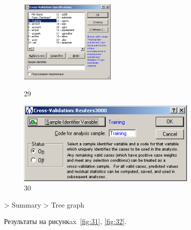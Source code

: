 \begin{figure}[!h]
  \centering

  \begin{minipage}{0.49\textwidth}
    \centering

    \includegraphics[height=4cm]
    {inc/29.PNG}

    \caption{29}

    \label{fig:29}
  \end{minipage}
  \begin{minipage}{0.49\textwidth}
    \centering

    \includegraphics[height=4cm]
    {inc/30.PNG}

    \caption{30}

    \label{fig:30}
  \end{minipage}
\end{figure}

\newpage

> Summary > Tree graph

Результаты на рисункax~\ref{fig:31}, \ref{fig:32}.

